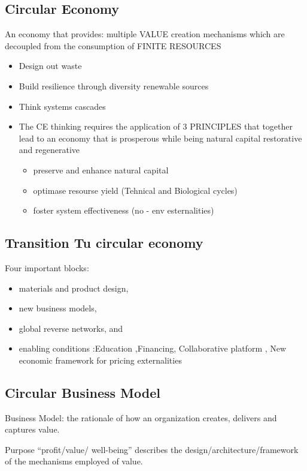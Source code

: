 \documentclass{article}
\begin{document}
\subsection{Circular Economy }

An economy that provides:
multiple VALUE creation
mechanisms which are decoupled
from the consumption of FINITE
RESOURCES
\begin{itemize}
	\item Design out waste
	\item Build resilience
	through diversity
	renewable sources
	\item  Think systems cascades
	\item The CE thinking requires the application of 3 PRINCIPLES that together
	lead to an economy that is prosperous while being natural capital
	restorative and regenerative
	\begin{itemize}
		\item preserve and enhance natural capital
		\item  optimase resourse yield (Tehnical and Biological cycles)
		\item foster system effectiveness (no - env esternalities)
	\end{itemize}
\end{itemize}

\subsection{Transition Tu circular economy}
Four important blocks:
\begin{itemize}
	\item materials and product design,
	\item new business models,
	\item  global reverse networks, and
	\item enabling conditions :Education ,Financing, Collaborative platform , New economic framework for pricing externalities
\end{itemize}

\subsection{Circular Business Model }
Business Model: the rationale of how an organization creates,
delivers and captures value.

Purpose “profit/value/ well-being”
describes the design/architecture/framework
of the mechanisms employed of value.
\end{document}
